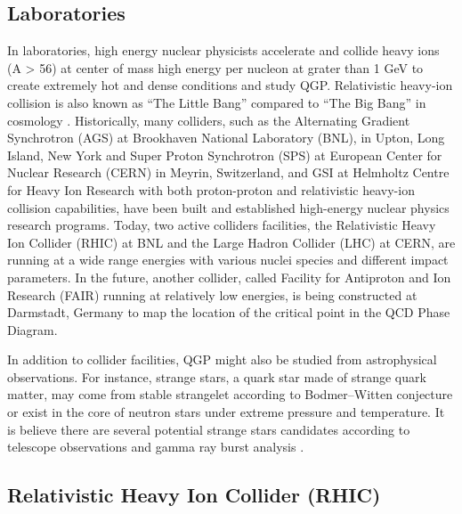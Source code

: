 \subsection{Laboratories}

In laboratories, high energy nuclear physicists accelerate and collide heavy ions (A > 56) at center of mass high energy per nucleon at grater than 1 GeV to create extremely hot and dense conditions and study QGP. Relativistic heavy-ion collision is also known as ``The Little Bang'' compared to ``The Big Bang'' in cosmology \cite{LittleBang}. Historically, many colliders, such as the Alternating Gradient Synchrotron (AGS) at Brookhaven National Laboratory (BNL), in Upton, Long Island, New York and Super Proton Synchrotron (SPS) at European Center for Nuclear Research (CERN) in Meyrin, Switzerland, and GSI at Helmholtz Centre for Heavy Ion Research with both proton-proton and relativistic heavy-ion collision capabilities, have been built and established high-energy nuclear physics research programs. Today, two active colliders facilities, the Relativistic Heavy Ion Collider (RHIC) at BNL and the Large Hadron Collider (LHC) at CERN, are running at a wide range energies with various nuclei species and different impact parameters. In the future, another collider, called Facility for Antiproton and Ion Research (FAIR) running at relatively low energies, is being constructed at Darmstadt, Germany to map the location of the critical point in the QCD Phase Diagram. 

In addition to collider facilities, QGP might also be studied from astrophysical observations. For instance, strange stars, a quark star made of strange quark matter, may come from stable strangelet according to Bodmer--Witten conjecture \cite{SQMReview} or exist in the core of neutron stars under extreme pressure and temperature. It is believe there are several potential strange stars candidates according to telescope observations and gamma ray burst analysis \cite{SS1,SS2,SS3}.


\subsection{Relativistic Heavy Ion Collider (RHIC)}

